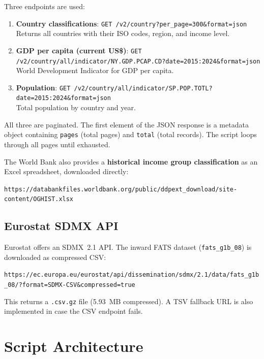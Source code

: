 \documentclass[12pt,a4paper]{article}
\begin{document}
Three endpoints are used:

\begin{enumerate}
    \item \textbf{Country classifications}: \texttt{GET /v2/country?per\_page=300\&format=json}\\
    Returns all countries with their ISO codes, region, and income level.
    \item \textbf{GDP per capita (current US\$)}: \texttt{GET /v2/country/all/indicator/NY.GDP.PCAP.CD?date=2015:2024\&format=json}\\
    World Development Indicator for GDP per capita.
    \item \textbf{Population}: \texttt{GET /v2/country/all/indicator/SP.POP.TOTL?date=2015:2024\&format=json}\\
    Total population by country and year.
\end{enumerate}

All three are paginated.
The first element of the JSON response is a metadata object containing \texttt{pages} (total pages) and \texttt{total} (total records).
The script loops through all pages until exhausted.

The World Bank also provides a \textbf{historical income group classification} as an Excel spreadsheet, downloaded directly:
\begin{center}
\small\texttt{https://databankfiles.worldbank.org/public/ddpext\_download/site-content/OGHIST.xlsx}
\end{center}


\subsection{Eurostat SDMX API}\label{sec:eurostat_api}

Eurostat offers an SDMX~2.1 API.
The inward FATS dataset (\texttt{fats\_g1b\_08}) is downloaded as compressed CSV:

\begin{center}
\small\texttt{https://ec.europa.eu/eurostat/api/dissemination/sdmx/2.1/data/fats\_g1b\_08/?format=SDMX-CSV\&compressed=true}
\end{center}

This returns a \texttt{.csv.gz} file (5.93~MB compressed).
A TSV fallback URL is also implemented in case the CSV endpoint fails.


\section{Script Architecture}\label{sec:architecture}
\end{document}
